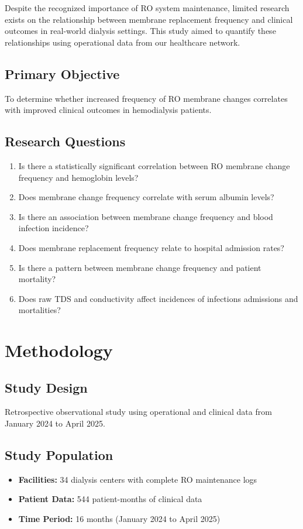 \documentclass[11pt,a4paper]{article}
\begin{document}
Despite the recognized importance of RO system maintenance, limited research exists on the relationship between membrane replacement frequency and clinical outcomes in real-world dialysis settings. This study aimed to quantify these relationships using operational data from our healthcare network.

\subsection{Primary Objective}
To determine whether increased frequency of RO membrane changes correlates with improved clinical outcomes in hemodialysis patients.

\subsection{Research Questions}
\begin{enumerate}
    \item Is there a statistically significant correlation between RO membrane change frequency and hemoglobin levels?
    \item Does membrane change frequency correlate with serum albumin levels?
    \item Is there an association between membrane change frequency and blood infection incidence?
    \item Does membrane replacement frequency relate to hospital admission rates?
    \item Is there a pattern between membrane change frequency and patient mortality?
    \item Does raw TDS and conductivity affect incidences of infections admissions and mortalities?
\end{enumerate}

\section{Methodology}

\subsection{Study Design}
Retrospective observational study using operational and clinical data from January 2024 to April 2025.

\subsection{Study Population}
\begin{itemize}
    \item \textbf{Facilities:} 34 dialysis centers with complete RO maintenance logs
    \item \textbf{Patient Data:} 544 patient-months of clinical data
    \item \textbf{Time Period:} 16 months (January 2024 to April 2025)
\end{itemize}
\end{document}

